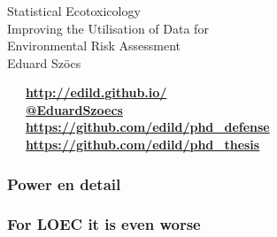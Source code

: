 \documentclass[
	12pt
	]{beamer}
\begin{document}
\begin{frame}[standout]
	\frametitle{}

	\vspace{1em}
	\Large{Statistical Ecotoxicology} \\[0.3em]
	\normalsize{Improving the Utilisation of Data for \\ Environmental Risk Assessment} \\[1em]

	\footnotesize
	Eduard Szöcs \\[3em]
\begin{flushleft}
	\faLaptop~~~\textbf{\href{http://edild.github.io/}{http://edild.github.io/ }}\\[.5em]
	\faTwitter~~~\textbf{\href{http://twitter.com/EduardSzoecs}{@EduardSzoecs}} 	\\[0.5em]
	\faFilePowerpointO~~~\textbf{\href{https://github.com/edild/phd_defense}{https://github.com/edild/phd\_defense}}\\[0.5em]
	\faBook~~~\textbf{\href{https://github.com/edild/phd_thesis}{https://github.com/edild/phd\_thesis}}\\[3em]
\end{flushleft}

	\begin{center}\ccbysa\end{center} 
\end{frame}




\appendix

\begin{frame}
\frametitle{Power en detail}
	\begin{adjustbox}{max totalsize={\textwidth}{\textheight}}
				
	\end{adjustbox}
\end{frame}


\begin{frame}
\frametitle{For LOEC it is even worse}
	\begin{adjustbox}{max totalsize={\textwidth}{\textheight}}
				
	\end{adjustbox}
\end{frame}
\end{document}
